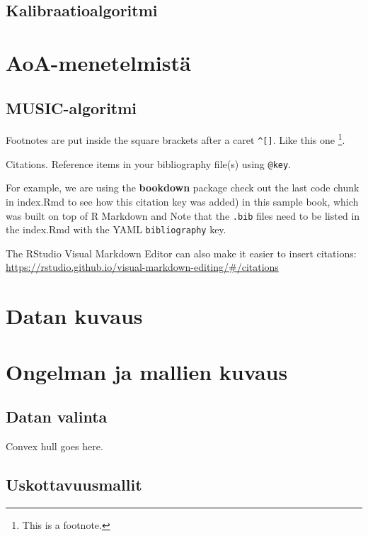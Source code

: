 \documentclass[
  12pt,
  a4paper, twoside]{book}
\begin{document}
\subsection{Kalibraatioalgoritmi}

\section{AoA-menetelmistä}

\subsection{MUSIC-algoritmi}

Footnotes are put inside the square brackets after a caret \texttt{\^{}{[}{]}}. Like this one \footnote{This is a footnote.}.

Citations. Reference items in your bibliography file(s) using \texttt{@key}.

For example, we are using the \textbf{bookdown} package check out the last code chunk in index.Rmd to see how this citation key was added) in this sample book, which was built on top of R Markdown and
Note that the \texttt{.bib} files need to be listed in the index.Rmd with the YAML \texttt{bibliography} key.

The RStudio Visual Markdown Editor can also make it easier to insert citations: \url{https://rstudio.github.io/visual-markdown-editing/\#/citations}

\hypertarget{datan-kuvaus}{%
\section{Datan kuvaus}\label{datan-kuvaus}}

\hypertarget{ongelman-ja-mallien-kuvaus}{%
\section{Ongelman ja mallien kuvaus}\label{ongelman-ja-mallien-kuvaus}}

\hypertarget{datan-valinta}{%
\subsection{Datan valinta}\label{datan-valinta}}

Convex hull goes here.

\hypertarget{uskottavuusmallit}{%
\subsection{Uskottavuusmallit}\label{uskottavuusmallit}}
\end{document}
